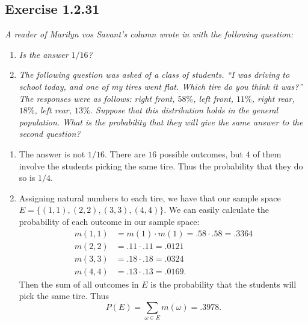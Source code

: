 \documentclass{tufte-handout}
\begin{document}
\subsection{Exercise 1.2.31}

\emph{A reader of Marilyn vos Savant's column wrote in with the
  following question: 
  }

\begin{enumerate}[label=\textit{(\alph*)}]
\item \textit{Is the answer $1/16$?}

\item \textit{The following question was asked of a class of
  students. ``I was driving to school today, and one of my tires
  went flat. Which tire do you think it was?'' The responses were as
  follows: right front, $58\%$, left front, $11\%$, right rear,
  $18\%$, left rear, $13\%$. Suppose that this distribution holds in
  the general population. What is the probability that they will
  give the same answer to the second question?}
\end{enumerate}

\bigskip

\begin{enumerate}[label=(\alph*)]
\item The answer is not $1/16$. There are $16$ possible
  outcomes, but $4$ of them involve the students picking the same
  tire. Thus the probability that they do so is $1/4$.
\item Assigning natural numbers to each tire, we have that
  our sample space $E = \{(1,1),(2,2),(3,3),(4,4)\}$. We can easily
  calculate the probability of each outcome in our sample space:
  \begin{align*}
    m(1,1) &= m(1) \cdot m(1) = .58 \cdot .58 = .3364\\
    m(2,2) &= .11 \cdot .11 = .0121\\
    m(3,3) &= .18 \cdot .18 = .0324\\
    m(4,4) &= .13 \cdot .13 = .0169.
  \end{align*}
  Then the sum of all outcomes in $E$ is the probability that the
  students will pick the same tire. Thus
  \[P(E) = \sum_{\omega \in E} m(\omega) = .3978.\]
\end{enumerate}
\end{document}
